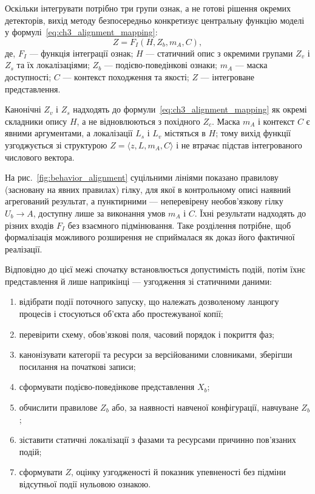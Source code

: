 Оскільки інтегрувати потрібно три групи ознак, а не готові рішення окремих детекторів, вихід методу безпосередньо конкретизує центральну функцію моделі у формулі~\eqref{eq:ch3_alignment_mapping}:
\begin{equation}
Z=F_I(H,Z_b,m_A,C),
\label{eq:ch3_alignment_mapping}
\end{equation}
де, $F_I$ --- функція інтеграції ознак; $H$ --- статичний опис з окремими групами $Z_v$ і $Z_s$ та їх локалізаціями; $Z_b$ --- подієво-поведінкові ознаки; $m_A$ --- маска доступності; $C$ --- контекст походження та якості; $Z$ --- інтегроване представлення.

Канонічні $Z_v$ і $Z_s$ надходять до формули~\eqref{eq:ch3_alignment_mapping} як окремі складники опису $H$, а не відновлюються з похідного $Z_c$. Маска $m_A$ і контекст $C$ є явними аргументами, а локалізації $L_s$ і $L_v$ містяться в $H$; тому вихід функції узгоджується зі структурою $Z=\langle z,L,m_A,C\rangle$ і не втрачає підстав інтегрованого числового вектора.

На рис.~\ref{fig:behavior_alignment} суцільними лініями показано правилову (засновану на явних правилах) гілку, для якої в контрольному описі наявний агрегований результат, а пунктирними --- неперевірену необов’язкову гілку $U_b\rightarrow A$, доступну лише за виконання умов $m_A$ і $C$. Їхні результати надходять до різних входів $F_I$ без взаємного підмінювання. Таке розділення потрібне, щоб формалізація можливого розширення не сприймалася як доказ його фактичної реалізації.



Відповідно до цієї межі спочатку встановлюється допустимість подій, потім їхнє представлення й лише наприкінці --- узгодження зі статичними даними:

\begin{enumerate}
\item відібрати події поточного запуску, що належать дозволеному ланцюгу процесів і стосуються об’єкта або простежуваної копії;
\item перевірити схему, обов’язкові поля, часовий порядок і покриття фаз;
\item канонізувати категорії та ресурси за версійованими словниками, зберігши посилання на початкові записи;
\item сформувати подієво-поведінкове представлення $X_b$;
\item обчислити правилове $Z_b$ або, за наявності навченої конфігурації, навчуване $Z_b$;
\item зіставити статичні локалізації з фазами та ресурсами причинно пов’язаних подій;
\item сформувати $Z$, оцінку узгодженості й показник упевненості без підміни відсутньої події нульовою ознакою.
\end{enumerate}

